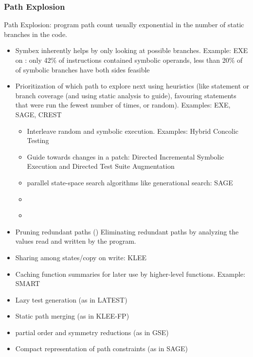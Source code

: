 \documentclass{article}
\begin{document}
\subsubsection{Path Explosion}
Path Explosion: program path count usually exponential in the number of static branches in the code.
\begin{itemize}
    \item Symbex inherently helps by only looking at possible branches. Example: EXE\cite{EXE} on : only 42\% of instructions contained symbolic operands, less than 20\% of of symbolic branches have both sides feasible\cite{EXE}
    \item Prioritization of which path to explore next using heuristics (like statement or branch coverage (and using static analysis to guide), favouring statements that were run the fewest number of times, or random). Examples: EXE\cite{EXE}, SAGE\cite{SAGE}, CREST\cite{CREST}
          \begin{itemize}
              \item Interleave random and symbolic execution. Examples: Hybrid Concolic Testing\cite{HCT}
              \item Guide towards changes in a patch: Directed Incremental Symbolic Execution\cite{DiSE} and Directed Test Suite Augmentation\cite{DTSA}
              \item parallel state-space search algorithms like generational search: SAGE\cite{SAGE}
              \item {}\cite{ReviewThreeDecades}
              \item {}\cite{Fitnex}
          \end{itemize}
    \item Pruning redundant paths (\cite{RWset}) Eliminating redundant paths by analyzing the values read and written by the program.
    \item Sharing among states/copy on write: KLEE\cite{KLEE}
    \item Caching function summaries for later use by higher-level functions. Example: SMART\cite{SMART}
    \item Lazy test generation (as in LATEST\cite{LATEST})
    \item Static path merging (as in KLEE-FP\cite{KLEEFP})
    \item partial order and symmetry reductions (as in GSE\cite{GSE})
    \item Compact representation of path constraints (as in SAGE\cite{SAGE})
\end{itemize}
\end{document}
